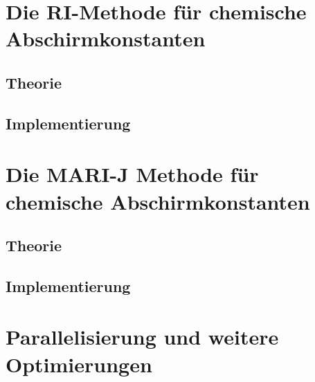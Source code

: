 \section{Die RI-Methode für chemische Abschirmkonstanten}
	\subsection{Theorie}
	\subsection{Implementierung}

\section{Die MARI-J Methode für chemische Abschirmkonstanten}
	\subsection{Theorie}
	\subsection{Implementierung}
	
\section{Parallelisierung und weitere Optimierungen}
